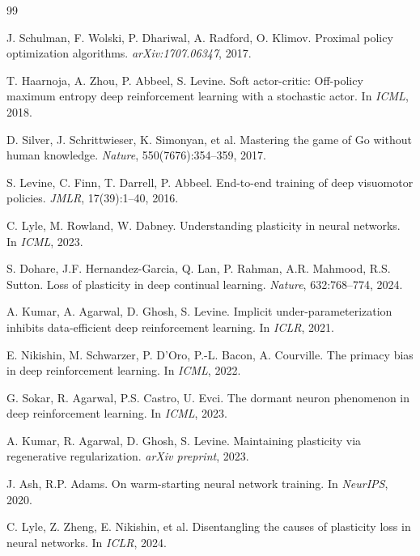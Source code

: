 \documentclass[twocolumn]{article}
\begin{document}

\begin{thebibliography}{99}

J. Schulman, F. Wolski, P. Dhariwal, A. Radford, O. Klimov.
Proximal policy optimization algorithms.
\emph{arXiv:1707.06347}, 2017.

T. Haarnoja, A. Zhou, P. Abbeel, S. Levine.
Soft actor-critic: Off-policy maximum entropy deep reinforcement learning with a stochastic actor.
In \emph{ICML}, 2018.

D. Silver, J. Schrittwieser, K. Simonyan, et al.
Mastering the game of Go without human knowledge.
\emph{Nature}, 550(7676):354--359, 2017.

S. Levine, C. Finn, T. Darrell, P. Abbeel.
End-to-end training of deep visuomotor policies.
\emph{JMLR}, 17(39):1--40, 2016.

C. Lyle, M. Rowland, W. Dabney.
Understanding plasticity in neural networks.
In \emph{ICML}, 2023.

S. Dohare, J.F. Hernandez-Garcia, Q. Lan, P. Rahman, A.R. Mahmood, R.S. Sutton.
Loss of plasticity in deep continual learning.
\emph{Nature}, 632:768--774, 2024.

A. Kumar, A. Agarwal, D. Ghosh, S. Levine.
Implicit under-parameterization inhibits data-efficient deep reinforcement learning.
In \emph{ICLR}, 2021.

E. Nikishin, M. Schwarzer, P. D'Oro, P.-L. Bacon, A. Courville.
The primacy bias in deep reinforcement learning.
In \emph{ICML}, 2022.

G. Sokar, R. Agarwal, P.S. Castro, U. Evci.
The dormant neuron phenomenon in deep reinforcement learning.
In \emph{ICML}, 2023.

A. Kumar, R. Agarwal, D. Ghosh, S. Levine.
Maintaining plasticity via regenerative regularization.
\emph{arXiv preprint}, 2023.

J. Ash, R.P. Adams.
On warm-starting neural network training.
In \emph{NeurIPS}, 2020.

C. Lyle, Z. Zheng, E. Nikishin, et al.
Disentangling the causes of plasticity loss in neural networks.
In \emph{ICLR}, 2024.


\end{thebibliography}
\end{document}
